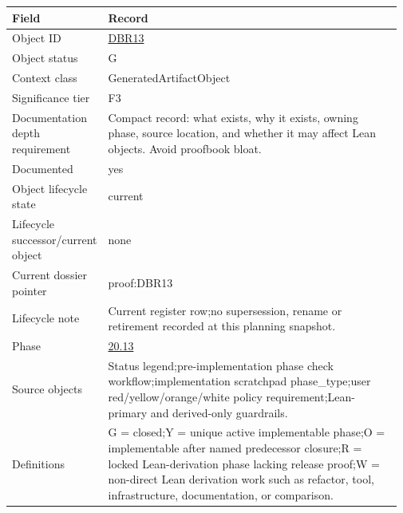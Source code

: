 \begin{longtable}{L{0.16\linewidth} L{0.81\linewidth}}
\hline
\textbf{Field} & \textbf{Record}\\
\hline
Object ID & \hyperlink{object-row-DBR13}{DBR13}\\
\hline\addlinespace[0.20em]
Object status & G\\
\hline\addlinespace[0.20em]
Context class & GeneratedArtifactObject\\
\hline\addlinespace[0.20em]
Significance tier & F3\\
\hline\addlinespace[0.20em]
Documentation depth requirement & Compact record: what exists, why it exists, owning phase, source location, and whether it may affect Lean objects. Avoid proofbook bloat.\\
\hline\addlinespace[0.20em]
Documented & yes\\
\hline\addlinespace[0.20em]
Object lifecycle state & current\\
\hline\addlinespace[0.20em]
Lifecycle successor/\allowbreak{}current object & none\\
\hline\addlinespace[0.20em]
Current dossier pointer & proof:DBR13\\
\hline\addlinespace[0.20em]
Lifecycle note & Current register row;\newline no supersession, rename or retirement recorded at this planning snapshot.\\
\hline\addlinespace[0.20em]
Phase & \hyperlink{phase-row-20-13}{20.13}\\
\hline\addlinespace[0.20em]
Source objects & Status legend;\newline pre-implementation phase check workflow;\newline implementation scratchpad phase\_type;\newline user red/\allowbreak{}yellow/\allowbreak{}orange/\allowbreak{}white policy requirement;\newline Lean-primary and derived-only guardrails.\\
\hline\addlinespace[0.20em]
Definitions & G = closed;\newline Y = unique active implementable phase;\newline O = implementable after named predecessor closure;\newline R = locked Lean-derivation phase lacking release proof;\newline W = non-direct Lean derivation work such as refactor, tool, infrastructure, documentation, or comparison.\\

\end{longtable}
